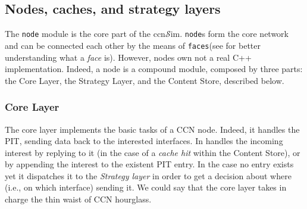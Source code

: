 \documentclass{article}
\newcommand{\ccnsim}{ccn$\mathcal{S}$im}
\begin{document}
\subsection{Nodes, caches, and strategy layers}
The \verb|node| module is the core part of the \ccnsim. \verb|node|s form the core network and can be connected each other by the means of \verb|faces|(see \cite{jacobson09conext} for better understanding what a \emph{face} is). However, nodes own not a real C++ implementation. Indeed,  a node is a compound module, composed by three parts: the Core Layer, the Strategy Layer, and the Content Store, described below. 
\subsubsection{Core Layer} 
The core layer implements the basic tasks of a CCN node. Indeed, it handles the PIT, sending data back to the interested interfaces. In handles the incoming interest by replying to it (in the case of a \emph{cache hit} within the Content Store), or by  appending the interest to the existent PIT entry. In the case no entry exists yet it dispatches it to the \emph{Strategy layer} in order to get a decision about where (i.e., on which interface) sending it. We could say that the core layer takes in charge the thin waist of CCN hourglass.
\end{document}
